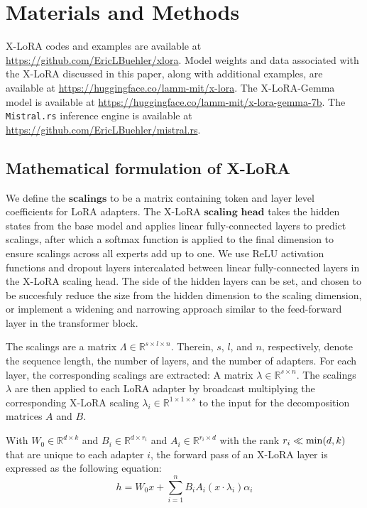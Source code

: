 \section{Materials and Methods}

X-LoRA codes and examples are available at \url{https://github.com/EricLBuehler/xlora}. Model weights and data associated with the X-LoRA discussed in this paper, along with additional examples, are available at \url{https://huggingface.co/lamm-mit/x-lora}. The X-LoRA-Gemma model is available at \url{https://huggingface.co/lamm-mit/x-lora-gemma-7b}.  The \texttt{Mistral.rs} inference engine is available at \url{https://github.com/EricLBuehler/mistral.rs}.

\subsection{Mathematical formulation of X-LoRA}
We define the $\mathbf{scalings}$ to be a matrix containing token and layer level coefficients for LoRA adapters. The X-LoRA $\mathbf{scaling}$ $\mathbf{head}$ takes the hidden states from the base model and applies linear fully-connected layers to predict scalings, after which a softmax function is applied to the final dimension to ensure scalings across all experts add up to one. 
We use ReLU activation functions and dropout layers intercalated between linear fully-connected layers in the X-LoRA scaling head. The side of the hidden layers can be set, and chosen to be succesfuly reduce the size from the hidden dimension to the scaling dimension, or implement a widening and narrowing approach similar to the feed-forward layer in the transformer block. 

The scalings are a matrix $\Lambda \in \mathbb{R}^{s \times l \times n}$. Therein, $s$, $l$, and $n$, respectively, denote the sequence length, the number of layers, and the number of adapters. For each layer, the corresponding scalings are extracted: A matrix $\lambda \in \mathbb{R}^{s \times n}$. The scalings $\lambda$ are then applied to each LoRA adapter by broadcast multiplying the corresponding X-LoRA scaling $\lambda_i \in \mathbb{R}^{1\times 1 \times s}$ to the input for the decomposition matrices $A$ and $B$.

With $W_0 \in \mathbb{R}^{d \times k}$ and $B_i \in \mathbb{R}^{d \times r_i}$ and $A_i \in \mathbb{R}^{r_i \times d}$ with the rank $r_i \ll {\rm min} (d,k)$ that are unique to each adapter $i$, the forward pass of an X-LoRA layer is expressed as the following equation:
\begin{equation}
    h = W_0x + \sum_{i=1}^{n} B_iA_i(x \cdot  \lambda_i) \alpha_i
\end{equation}

